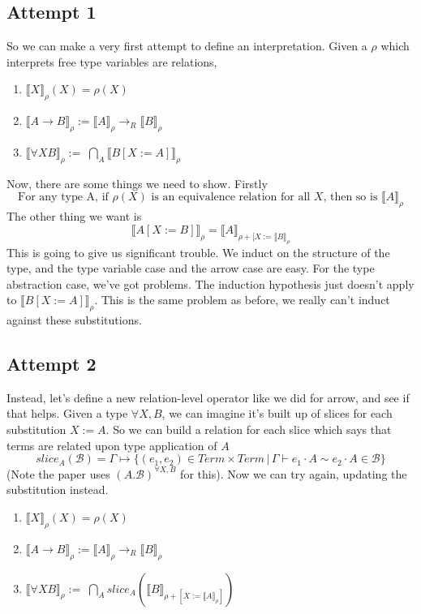 \documentclass[12pt]{article}
\begin{document}
\subsection{Attempt 1}
So we can make a very first attempt to define an interpretation.
Given a $\rho$ which interprets free type variables are relations,
\begin{enumerate}
    \item  $\llbracket X \rrbracket_\rho(X) = \rho(X)$
    \item  $\llbracket A \rightarrow B \rrbracket_\rho := \llbracket A \rrbracket_\rho \rightarrow_R \llbracket B \rrbracket_\rho$
    \item  $\llbracket \forall X B \rrbracket_\rho :=\; \bigcap_{A} \llbracket B[X := A]\rrbracket_\rho$
\end{enumerate}
Now, there are some things we need to show. Firstly
\[
\text{For any type A, if $\rho(X)$ is an equivalence relation for all $X$, then so is $\llbracket A \rrbracket_\rho$}
\]
The other thing we want is
\[
\llbracket A[X := B] \rrbracket_\rho = \llbracket A \rrbracket_{\rho + [X := \llbracket B \rrbracket_\rho}
\]
This is going to give us significant trouble.
We induct on the structure of the type, and the type variable case and the arrow case are easy.
For the type abstraction case, we've got problems. 
The induction hypothesis just doesn't apply to $\llbracket B[X:=A]\rrbracket_\rho$.
This is the same problem as before, we really can't induct against these substitutions.

\subsection{Attempt 2}
Instead, let's define a new relation-level operator like we did for arrow, and see if that helps.
Given a type $\forall X, B$, we can imagine it's built up of slices for each substitution $X := A$.
So we can build a relation for each slice which says that terms are related upon type application of $A$
\[
slice_A(\mathcal{B}) =\Gamma \mapsto \{(e_1,e_2) \in Term \times Term \,|\, 
  \Gamma \vdash e_1 \cdot A \sim e_2 \cdot A \in \mathcal{B} \}
\]
(Note the paper uses $(A.\mathcal{B})^{\forall X, B}$ for this).
Now we can try again, updating the substitution instead.
\begin{enumerate}
    \item  $\llbracket X \rrbracket_\rho(X) = \rho(X)$
    \item  $\llbracket A \rightarrow B \rrbracket_\rho := \llbracket A \rrbracket_\rho \rightarrow_R \llbracket B \rrbracket_\rho$
    \item  $\llbracket \forall X B \rrbracket_\rho :=\; \bigcap_{A} slice_A(\llbracket B\rrbracket_{\rho + [X := \llbracket A\rrbracket_\rho]})$
\end{enumerate}
\end{document}
